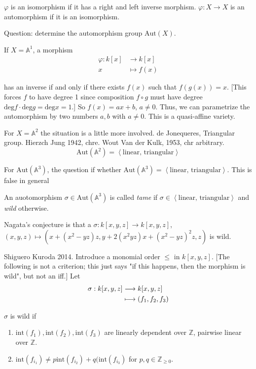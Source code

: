 $\varphi$ is an isomorphism if it has a right
and left inverse morphism.
$\varphi:X \to X$ is an automorphism
if it is an isomorphism.

\medskip\noindent
Question: determine the automorphism group
$\text{Aut}(X)$.

If $X=\mathbb{A}^1$, a morphism
$$
\begin{aligned}
\varphi: k[x] &\longrightarrow k[x] \\
x &\longmapsto f(x)
\end{aligned}
$$

\noindent
has an inverse if and only if there exists
$f(x)$ such that $f(g(x))=x$.
[This forces $f$ to have degree 1 since
composition $f \circ g$ must have degree
$\text{deg} f \cdot \text{deg} g = \text{deg}
x=1$.]
So $f(x)=ax+b$, $a\neq 0$.
Thus, we can parametrize the automorphism by
two numbers
$a,b$ with $a \neq 0$. This is a quasi-affine
variety.

For $X=\mathbb{A}^2$
the situation is a little more involved.
de Jonequeres, Triangular group.
Hierzch Jung 1942, chre.
Wout Van der Kulk, 1953, chr arbitrary.
$$
\text{Aut}(\mathbb{A}^2)
=\left\langle{}\text{linear, triangular}\right\rangle{}
$$

For $\text{Aut}(\mathbb{A}^3)$,
the question if whether
$\text{Aut}(\mathbb{A}^3)=
\left\langle{}\text{linear, triangular}\right\rangle{}$.
This is false in general

\begin{definition}
\label{definition-tame}
An auotomorphism $\sigma \in
\text{Aut}(\mathbb{A}^3)$
is called {\it tame} if $\sigma \in
\left\langle{}\text{linear, triangular}\right\rangle{}$
and {\it wild} otherwise.
\end{definition}

\noindent
Nagata's conjecture is that
a $\sigma:k[x,y,z] \to k[x,y,z]$,
$(x,y,z) \mapsto
(x+(x^2-yz)z,y+2(x^2yz)x+(x^2-yz)^2z,z)$
is wild.

Shiguero Kuroda 2014. Introduce a monomial
order
$\leq $ in $k[x,y,z]$.
[The following is not a criterion;
this just says "if this happens, then the
morphism is wild",
but not an iff.]
Let
$$
\begin{aligned}
\sigma: k[x,y,z] &\longrightarrow k[x,y,z] \\
\leavevmode &\longmapsto (f_1,f_2,f_3)
\end{aligned}
$$

\noindent
$\sigma$ is wild if
\begin{enumerate}
\item $\text{int}(f_1),\text{int}(f_2),
\text{int}(f_3)$
are linearly dependent over $\mathbb{Z}$,
pairwise linear over $\mathbb{Z}$.
\item $\text{int}(f_{i_1}) \neq  p
\text{int}(f_{i_2})+q(\text{int}(f_{i_3})$
for $p,q \in \mathbb{Z}_{\geq 0}$.
\end{enumerate}

